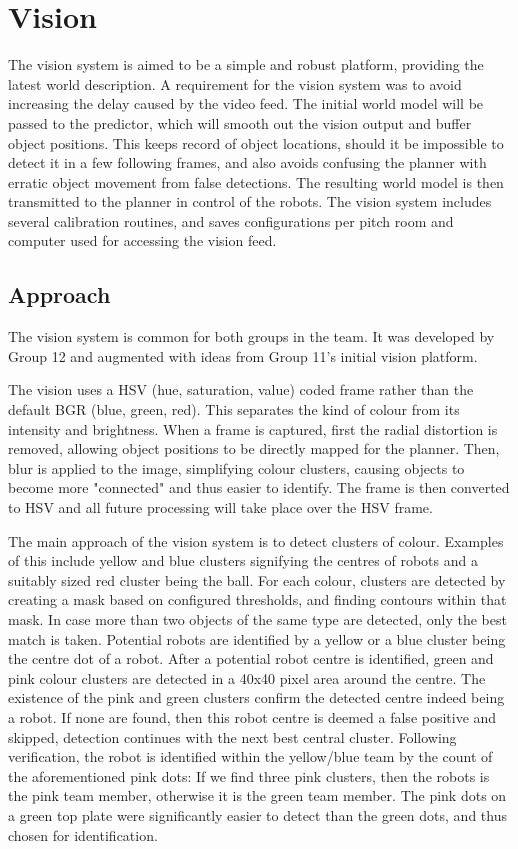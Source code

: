 \section{Vision}

The vision system is aimed to be a simple and robust platform, providing the latest world description. A requirement for the vision system was to avoid increasing the delay caused by the video feed. The initial world model will be passed to the predictor, which will smooth out the vision output and buffer object positions. This keeps record of object locations, should it be impossible to detect it in a few following frames, and also avoids confusing the planner with erratic object movement from false detections. The resulting world model is then transmitted to the planner in control of the robots. The vision system includes several calibration routines, and saves configurations per pitch room and computer used for accessing the vision feed.

\subsection{Approach}

The vision system is common for both groups in the team. It was developed by Group 12 and augmented with ideas from Group 11's initial vision platform. 

The vision uses a HSV (hue, saturation, value) coded frame rather than the default BGR (blue, green, red). This separates the kind of colour from its intensity and brightness. When a frame is captured, first the radial distortion is removed, allowing object positions to be directly mapped for the planner. Then, blur is applied to the image, simplifying colour clusters, causing objects to become more "connected" and thus easier to identify. The frame is then converted to HSV and all future processing will take place over the HSV frame.

The main approach of the vision system is to detect clusters of colour. Examples of this include yellow and blue clusters signifying the centres of robots and a suitably sized red cluster being the ball. For each colour, clusters are detected by creating a mask based on configured thresholds, and finding contours within that mask. In case more than two objects of the same type are detected, only the best match is taken. Potential robots are identified by a yellow or a blue cluster being the centre dot of a robot. After a potential robot centre is identified, green and pink colour clusters are detected in a 40x40 pixel area around the centre. The existence of the pink and green clusters confirm the detected centre indeed being a robot. If none are found, then this robot centre is deemed a false positive and skipped, detection continues with the next best central cluster.  Following verification, the robot is identified within the yellow/blue team by the count of the aforementioned pink dots: If we find three pink clusters, then the robots is the pink team member, otherwise it is the green team member. The pink dots on a green top plate were significantly easier to detect than the green dots, and thus chosen for identification.

